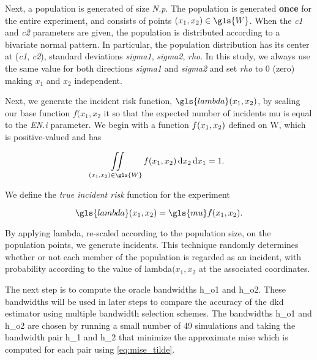 Next, a population is generated of size \textit{N.p}.
The population is generated \textbf{once} for the entire experiment, and consists of points $\xvec \in \gls{W}$.
When the \textit{c1} and \textit{c2} parameters are given, the population is distributed according to a bivariate normal pattern.
In particular, the population distribution has its center at (\textit{c1}, \textit{c2}),
standard deviations \textit{sigma1}, \textit{sigma2}, \textit{rho}.
In this study, we always use the same value for both directions \textit{sigma1} and \textit{sigma2} and set \textit{rho} to 0 (zero) making $x_1$ and $x_2$ independent.

Next, we generate the incident risk function, $\gls{lambda}\xvec$, by scaling our base function $f(x_1, x_2$ it so that the expected number of incidents \gls{mu} is equal to the \textit{EN.i} parameter.
We begin with a function $f(x_1, x_2)$ defined on \gls{W}, which is positive-valued and has 

\begin{equation*}
    \iint\limits_{(x_1,x_2)\in\gls{W}} {f\xvec \diff{x_2} \diff{x_1}} = 1
    \text{.}
\end{equation*}

We define the \textit{true incident risk} function for the experiment

\begin{equation}
    \gls{lambda}\xvec = \gls{mu} f\xvec \text{.}
\end{equation}

By applying \gls{lambda}, re-scaled according to the population size, on the population points, we generate incidents.
This technique randomly determines whether or not each member of the population is regarded as an incident, with probability according to the value of \gls{lambda}$(x_1, x_2$ at the associated coordinates.

The next step is to compute the \gls{oracle} bandwidths \gls{h_o1} and \gls{h_o2}.
These bandwidths will be used in later steps to compare the accuracy of the \gls{dkd} estimator using multiple bandwidth selection schemes.
The bandwidths \gls{h_o1} and \gls{h_o2} are chosen by running a small number of 49 simulations and taking the bandwidth pair \gls{h_1} and \gls{h_2} that minimize the approximate \gls{mise} which is computed for each pair using \cref{eq:mise_tilde}.

